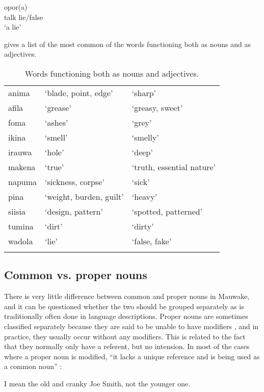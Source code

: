 \ea%
\label{ex:3:x1823}
\gll opor(a)  \\
talk lie/false\\
\glt`a lie'
\z

 gives a list of the most common of the words functioning both as nouns and as adjectives.

\begin{table}
 \caption{Words functioning both as nouns and adjectives.}
\label{tab:3:nounadj}

\begin{tabular}{lll} 
\mytoprule
anima &`blade, point, edge' &`sharp'\\
afila &`grease' &`greasy, sweet'\\
foma &`ashes' &`grey'\\
ikina &`smell' &`smelly'\\
irauwa &`hole' &`deep'\\
makena &`true' &`truth, essential nature'\\
napuma &`sickness, corpse' &`sick'\\
pina &`weight, burden, guilt' &`heavy'\\
siisia &`design, pattern' &`spotted, patterned'\\
tumina &`dirt' &`dirty'\\
wadola &`lie' &`false, fake'\\
\mybottomrule
\end{tabular} 

\end{table}
\subsection{Common vs. proper nouns}\label{sec:3:2:3}
{}
There is very little difference between common and proper nouns in Mauwake, and it can be questioned whether the two should be grouped separately as is traditionally often done in language descriptions. Proper nouns are sometimes classified separately because they are said to be unable to have modifiers \citep[152]{Roberts1987}, and in practice, they usually occur without any modifiers. This is related to the fact that they normally only have a referent, but no intension. In most of the cases where a proper noun is modified, ``it lacks a unique reference and is being used as a common noun'' \citep[59]{VanValinEtAl1997}:

\ea
  I mean the old and cranky Joe Smith, not the younger one. 
\z

